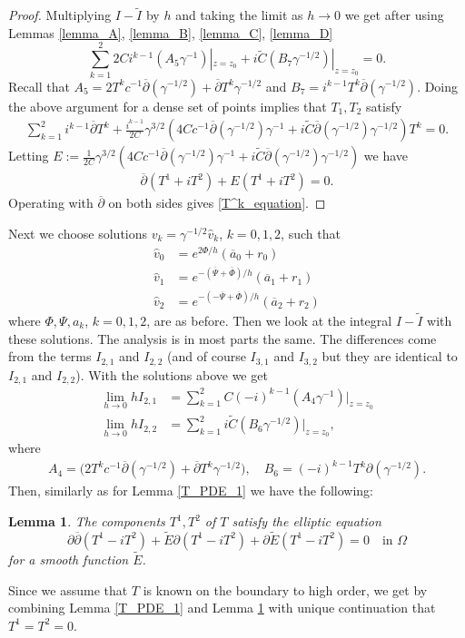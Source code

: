 \documentclass[a4paper, 10pt, twoside, notitlepage]{amsart}
\theoremstyle{plain}
\newtheorem{lem}[prop]{Lemma}
\newcommand{\Om}{\Omega}
\numberwithin{equation}{section}
\newcommand {\p} {\partial}
\newcommand{\dbar}{\ol{\p}}
\newcommand{\ol}[1]{\overline{#1}}
\begin{document}
\begin{proof}
	Multiplying $I-\tilde I$ by $h$ and taking the limit as $h\to 0$ we get after using Lemmas \ref{lemma_A}, \ref{lemma_B}, \ref{lemma_C}, \ref{lemma_D}
	\begin{equation*}
		\sum_{k=1}^2 2Ci^{k-1}(A_5\gamma^{-1})|_{z=z_0} + i\tilde C(B_7\gamma^{-1/2})|_{z=z_0} = 0.
	\end{equation*}
	Recall that $A_5=2T^kc^{-1}\dbar(\gamma^{-1/2}) + \dbar T^k\gamma^{-1/2}$ and $B_7=i^{k-1}T^k\dbar(\gamma^{-1/2})$.
	Doing the above argument for a dense set of points implies that $T_1, T_2$ satisfy
	\begin{align*}
		\sum_{k=1}^2 i^{k-1}\dbar T^k + \frac{i^{k-1}}{2C}\gamma^{3/2}\left(4Cc^{-1}\dbar(\gamma^{-1/2})\gamma^{-1} + i\tilde C \dbar(\gamma^{-1/2})\gamma^{-1/2}\right)T^k = 0.
	\end{align*}
	Letting $E:= \frac{1}{2C}\gamma^{3/2}\left(4Cc^{-1}\dbar(\gamma^{-1/2})\gamma^{-1} + i\tilde C \dbar(\gamma^{-1/2})\gamma^{-1/2}\right)$ we have
	\begin{align*}
		\dbar(T^1 + iT^2)+E(T^1 + iT^2) = 0.
	\end{align*}
	Operating with $\dbar$ on both sides gives \eqref{T^k_equation}.
\end{proof}

Next we choose solutions $v_k = \gamma^{-1/2}\hat{v}_k$, $k=0,1,2$, such that
\begin{align*}
	\hat{v}_0 &= e^{2\Phi/h}(\ol{a}_0 + r_0)\\
	\hat{v}_1 &= e^{-(\ol{\Psi}+\ol{\Phi})/h}(\ol{a}_1 + r_1)\\
	\hat{v}_2 &= e^{-(-\ol{\Psi}+\ol{\Phi})/h}(\ol{a}_2 + r_2)
\end{align*}
where $\Phi, \Psi, a_k$, $k=0,1,2$, are as before. Then we look at the integral $I-\tilde I$ with these solutions. The analysis is in most parts the same. The differences come from the terms $I_{2,1}$ and $I_{2,2}$ (and of course $I_{3,1}$ and $I_{3,2}$ but they are identical to $I_{2,1}$ and $I_{2,2}$). With the solutions above we get
\begin{align*}
	\lim_{h\to 0} hI_{2,1} &= \sum_{k=1}^2C(-i)^{k-1}(A_4\gamma^{-1})|_{z=z_0}\\
	\lim_{h\to 0} hI_{2,2} &= \sum_{k=1}^2i\tilde C(B_6\gamma^{-1/2})|_{z=z_0},
\end{align*}
where
\begin{align*}
	A_4 = \Big(2T^kc^{-1}\dbar(\gamma^{-1/2}) + \dbar T^k\gamma^{-1/2}\Big),\quad B_6 = (-i)^{k-1}T^k\p(\gamma^{-1/2}).
\end{align*}
Then, similarly as for Lemma \ref{T_PDE_1} we have the following:
\begin{lem}\label{T_PDE_2}
	The components $T^1, T^2$ of $T$ satisfy the elliptic equation
	\begin{equation*}
		\p\dbar(T^1-iT^2) + \tilde E\p(T^1 - iT^2) + \p \tilde E(T^1 - iT^2) = 0\quad \text{in  }\Om
	\end{equation*}
	for a smooth function $\tilde E$.
\end{lem}
Since we assume that $T$ is known on the boundary to high order, we get by combining Lemma \ref{T_PDE_1} and Lemma \ref{T_PDE_2} with unique continuation that $T^1=T^2=0$. 
\end{document}
